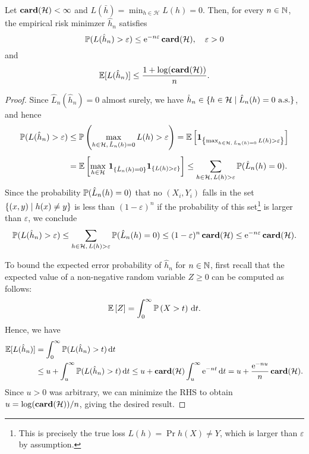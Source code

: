 \begin{theorem}
Let $\card{\mathcal{H}} < \infty$ and $L(\bar h) = \min_{h \in \mathcal{H}} L(h) = 0$. Then, for every $n \in \N$, the empirical risk minimzer $\hat h_n$ satisfies
\[
    \P(L(\hat h_n) > \varepsilon) \leq \e^{-n \varepsilon} \, \card{\mathcal{H}}, \quad \varepsilon > 0
\]
and
\[
    \ex{L(\hat h_n)} \leq \frac{1 + \log(\card{\mathcal{H}})}{n}.
\]
\end{theorem}

\begin{proof}
Since $\hat L_n(\hat h_n) = 0$ almost surely, we have $\hat h_n \in \{h \in \mathcal{H} \with \hat L_n(h) = 0 \text{ a.s.}\}$, and hence
\begin{align*}
    \P(L(\hat h_n) > \varepsilon) &\leq \Pr{\max_{h \in \mathcal{H},\,\hat L_n(h) = 0} L(h) > \varepsilon} = \Ex{\indSet{\max_{h \in \mathcal{H},\,\hat L_n(h) = 0} L(h) > \varepsilon}} \\[4pt]
        &=\Ex{\max_{h\in\mathcal{H}}\, \mathbf{1}_{\{\hat L_n(h) = 0\}} \indSet{L(h) > \varepsilon}} \leq \sum_{h\in\mathcal{H},\,L(h) > \varepsilon} \P(\hat L_n(h) = 0).
\end{align*}
Since the probability $\P(\hat L_n(h) = 0)$ that no $(X_i, Y_i)$ falls in the set $\set{(x, y) \with h(x) \neq y}$ is less than $(1 - \varepsilon)^n$ if the probability of this set\footnote{This is precisely the true loss $L(h) = \Pr{h(X) \neq Y}$, which is larger than $\varepsilon$ by assumption.} is larger than $\varepsilon$, we conclude
\[
    \P(L(\hat h_n) > \varepsilon) \leq \sum_{h\in\mathcal{H}, \, L(h) > \varepsilon} \P(\hat L_n(h) = 0) \leq (1 - \varepsilon)^n \, \card{\mathcal{H}} \leq \e^{-n \varepsilon} \, \card{\mathcal{H}}.
\]

To bound the expected error probability of $\hat h_n$ for $n \in \N$, first recall that the expected value of a non-negative random variable $Z \geq 0$ can be computed as follows:
\[
    \Ex{Z} = \int_0^\infty \Pr{X > t} \dt.
\]
Hence, we have
\begin{align*}
    \ex{L(\hat h_n)} &= \int_0^\infty \P(L(\hat h_n) > t) \dt \\
        &\leq u + \int_u^\infty \P(L(\hat h_n) > t) \dt \leq u + \card{\mathcal{H}} \int_u^\infty \e^{-nt} \dt = u + \frac{\e^{-nu}}{n} \, \card{\mathcal{H}}.
\end{align*}
Since $u > 0$ was arbitrary, we can minimize the RHS to obtain $u = \log(\card{\mathcal{H}}) / n$, giving the desired result.
\end{proof}
